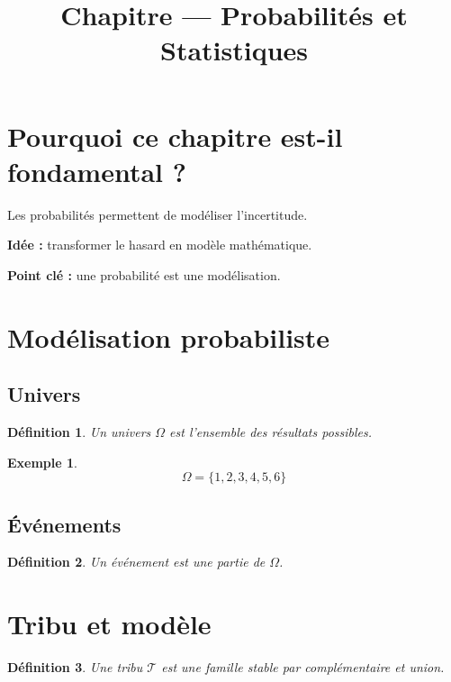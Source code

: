 \documentclass[11pt,a4paper]{article}
\newtheorem{definition}{Définition}
\newtheorem{exemple}{Exemple}
\begin{document}
\title{\textbf{Chapitre — Probabilités et Statistiques}}
\maketitle

\tableofcontents

\section{Pourquoi ce chapitre est-il fondamental ?}

Les probabilités permettent de modéliser l’incertitude.

\textbf{Idée :} transformer le hasard en modèle mathématique.

\textbf{Point clé :} une probabilité est une modélisation.

\section{Modélisation probabiliste}

\subsection{Univers}

\begin{definition}
Un univers $\Omega$ est l’ensemble des résultats possibles.
\end{definition}

\begin{exemple}
\[
\Omega = \{1,2,3,4,5,6\}
\]
\end{exemple}

\subsection{Événements}

\begin{definition}
Un événement est une partie de $\Omega$.
\end{definition}

\section{Tribu et modèle}

\begin{definition}
Une tribu $\mathcal{T}$ est une famille stable par complémentaire et union.
\end{definition}
\end{document}
